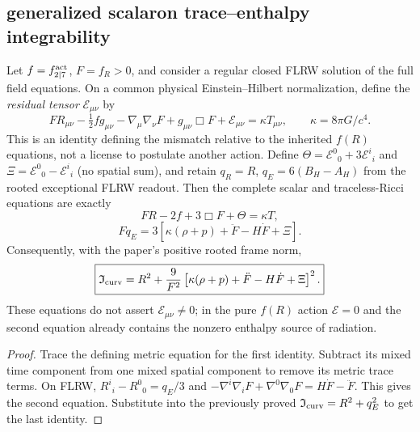 \documentclass[12pt,a4paper]{article}
\begin{document}
\subsection{generalized scalaron trace--enthalpy integrability}
\label{p8:sec:v2167-curvature-integrability}
\begin{theorem}
\label{p8:thm:v2167-trace-enthalpy-complete-curvature}
Let \(f=f_{2\mid7}^{\rm act}\), \(F=f_R>0\), and consider a regular
closed FLRW solution of the full field equations.  On a common physical
Einstein--Hilbert normalization, define the \emph{residual tensor}
\(\mathcal E_{\mu\nu}\) by
\[
 F R_{\mu\nu}-\tfrac12f g_{\mu\nu}
 -\nabla_\mu\nabla_\nu F+g_{\mu\nu}\Box F
 +\mathcal E_{\mu\nu}=\kappa T_{\mu\nu},
 \qquad \kappa=8\pi G/c^4.
\]
This is an identity defining the mismatch relative to the inherited
\(f(R)\) equations, not a license to postulate another action.  Define
\(\Theta=\mathcal E^0{}_0+3\mathcal E^i{}_i\) and
\(\Xi=\mathcal E^0{}_0-\mathcal E^i{}_i\) (no spatial sum), and retain
\(q_R=R\), \(q_E=6(B_H-A_H)\) from the rooted exceptional FLRW readout.
Then the complete scalar and traceless-Ricci equations are exactly
\[
 \boxed{FR-2f+3\Box F+\Theta=\kappa T,}
\]
\[
 \boxed{Fq_E=3\left[\kappa(\rho+p)+\ddot F-H\dot F+\Xi\right].}
\]
Consequently, with the paper's positive rooted frame norm,
\[
 \boxed{\mathfrak I_{\rm curv}=R^2+\frac9{F^2}
 \left[\kappa(\rho+p)+\ddot F-H\dot F+\Xi\right]^2.}
\]
These equations do not assert \(\mathcal E_{\mu\nu}\ne0\); in the
pure \(f(R)\) action \(\mathcal E=0\) and the second equation already
contains the nonzero enthalpy source of radiation.
\end{theorem}
\begin{proof}
Trace the defining metric equation for the first identity.  Subtract its
mixed time component from one mixed spatial component to remove its metric
trace terms.  On FLRW,
\(R^i{}_i-R^0{}_0=q_E/3\) and
\(-\nabla^i\nabla_iF+\nabla^0\nabla_0F=H\dot F-\ddot F\).
This gives the second equation.  Substitute into the previously proved
\(\mathfrak I_{\rm curv}=R^2+q_E^2\) to get the last identity.
\end{proof}
\end{document}

